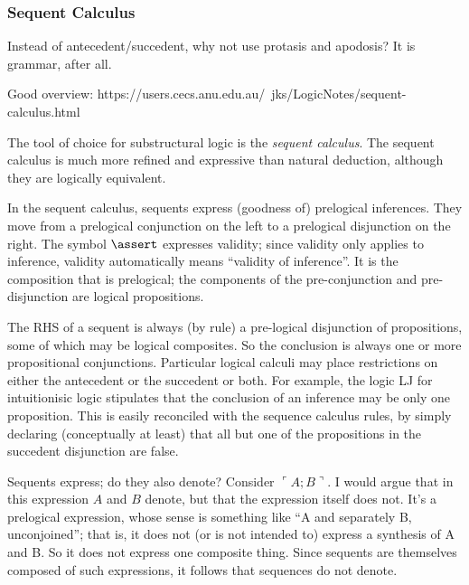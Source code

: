 \documentclass{article}
\begin{document}

\subsubsection{Sequent Calculus}

Instead of antecedent/succedent, why not use protasis and apodosis? It
is grammar, after all.

Good overview:
https://users.cecs.anu.edu.au/~jks/LogicNotes/sequent-calculus.html


The tool of choice for substructural logic is the \textit{sequent
  calculus}. The sequent calculus is much more refined and expressive
than natural deduction, although they are logically equivalent.

In the sequent calculus, sequents express (goodness of) prelogical
inferences. They move from a prelogical conjunction on the left to a
prelogical disjunction on the right. The symbol \(\linfer\) expresses
validity; since validity only applies to inference, validity
automatically means ``validity of inference''. It is the composition
that is prelogical; the components of the pre-conjunction and
pre-disjunction are logical propositions.

The RHS of a sequent is always (by rule) a pre-logical disjunction of
propositions, some of which may be logical composites. So the
conclusion is always one or more propositional conjunctions.
Particular logical calculi may place restrictions on either the
antecedent or the succedent or both. For example, the logic LJ for
intuitionisic logic stipulates that the conclusion of an inference may
be only one proposition. This is easily reconciled with the sequence
calculus rules, by simply declaring (conceptually at least) that all
but one of the propositions in the succedent disjunction are false.

Sequents express; do they also denote? Consider \(\ulcorner
A;B\urcorner\). I would argue that in this expression \(A\) and \(B\)
denote, but that the expression itself does not. It's a prelogical
expression, whose sense is something like ``A and separately B,
unconjoined''; that is, it does not (or is not intended to) express a
synthesis of A and B. So it does not express one composite thing.
Since sequents are themselves composed of such expressions, it follows
that sequences do not denote.
\end{document}
